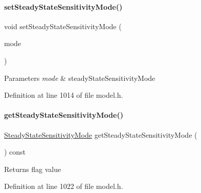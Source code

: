 \paragraph{\texorpdfstring{set\+Steady\+State\+Sensitivity\+Mode()}{setSteadyStateSensitivityMode()}}
{\footnotesize\ttfamily void set\+Steady\+State\+Sensitivity\+Mode (\begin{DoxyParamCaption}\item[{const \mbox{\hyperlink{namespaceamici_a1f7d44f04185d57423d01d47d13470a6}{Steady\+State\+Sensitivity\+Mode}}}]{mode }\end{DoxyParamCaption})}


\begin{DoxyParams}{Parameters}
{\em mode} & steady\+State\+Sensitivity\+Mode \\
\hline
\end{DoxyParams}


Definition at line 1014 of file model.\+h.

\mbox{\label{classamici_1_1_model_abe272de7f41f621d27d169f7918ecac3}} 
\paragraph{\texorpdfstring{get\+Steady\+State\+Sensitivity\+Mode()}{getSteadyStateSensitivityMode()}}
{\footnotesize\ttfamily \mbox{\hyperlink{namespaceamici_a1f7d44f04185d57423d01d47d13470a6}{Steady\+State\+Sensitivity\+Mode}} get\+Steady\+State\+Sensitivity\+Mode (\begin{DoxyParamCaption}{ }\end{DoxyParamCaption}) const}

\begin{DoxyReturn}{Returns}
flag value 
\end{DoxyReturn}


Definition at line 1022 of file model.\+h.

\mbox{\label{classamici_1_1_model_aaf26e3d4c8b574bc7e63f8beea677bcb}} 
